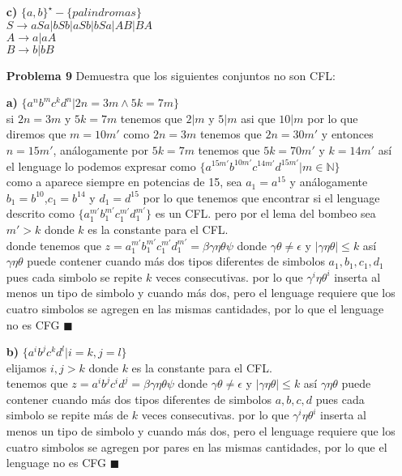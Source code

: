 \documentclass{article}
\begin{document}
\begin{enumerate}
\item[\bf{c)}]  $ \{a,b\}^{\star} - \{palindromas\}$\\

$S \rightarrow aSa| bSb | aSb | bSa | AB | BA $\\
$A \rightarrow a|aA  $\\
$B \rightarrow b|bB  $\\


\item[\bf{Problema 9}] Demuestra que los siguientes conjuntos no son CFL:
\item[\bf{a)}]  $\{a^{n}b^{m}c^{k}d^{n}| 2n=3m \wedge 5k=7m  \}$\\
si $2n=3m$ y $5k=7m$ tenemos que $2|m$ y $5|m$ asi que $10|m$ por lo que diremos que $m=10m'$
como $2n=3m$ tenemos que $2n=30m'$ y entonces $n=15m'$, análogamente por $5k=7m$ tenemos que $5k=70m'$ y $k=14m'$
así el lenguage lo podemos expresar como $\{a^{15m'}b^{10m'}c^{14m'}d^{15m'}| m \in \mathbb{N}  \}$\\
como a aparece siempre en potencias de 15, sea $a_1=a^{15}$ y análogamente $b_1=b^{10}$,$c_1=b^{14}$ y $d_1=d^{15}$
por lo que tenemos que encontrar si el lenguage descrito como $\{a_1^{m'}b_1^{m'}c_1^{m'}d_1^{m'}\}$ es un CFL.
pero por el lema del bombeo sea $m'>k$ donde $k$ es la constante para el CFL.\\
donde tenemos que $z= a_1^{m'}b_1^{m'}c_1^{m'}d_1^{m'} = \beta \gamma \eta \theta \psi $ donde $ \gamma \theta \ne \epsilon$ y $|\gamma \eta \theta | \le k$
así $\gamma \eta \theta$ puede contener cuando más dos tipos diferentes de simbolos $a_1,b_1,c_1,d_1$ pues cada simbolo se repite $k$ veces consecutivas.
por lo que $\gamma^i \eta \theta^i$ inserta al menos un tipo de simbolo y cuando más dos, pero el lenguage requiere que los cuatro simbolos se agregen en las mismas
cantidades, por lo que el lenguage no es CFG $\blacksquare$

\item[\bf{b)}]  $ \{a^{i}b^{j}c^{k}d^{l} | i=k, j=l \}$\\
elijamos $i,j > k$ donde $k$ es la constante para el CFL.\\
tenemos que $z= a^{i}b^{j}c^{i}d^{j} = \beta \gamma \eta \theta \psi $ donde $ \gamma \theta \ne \epsilon$ y $|\gamma \eta \theta | \le k$
así $\gamma \eta \theta$ puede contener cuando más dos tipos diferentes de simbolos $a,b,c,d$ pues cada simbolo se repite más de $k$ veces consecutivas.
por lo que $\gamma^i \eta \theta^i$ inserta al menos un tipo de simbolo y cuando más dos, pero el lenguage requiere que los cuatro simbolos se agregen por pares en las mismas
cantidades, por lo que el lenguage no es CFG $\blacksquare$




\end{enumerate}
\end{document}
